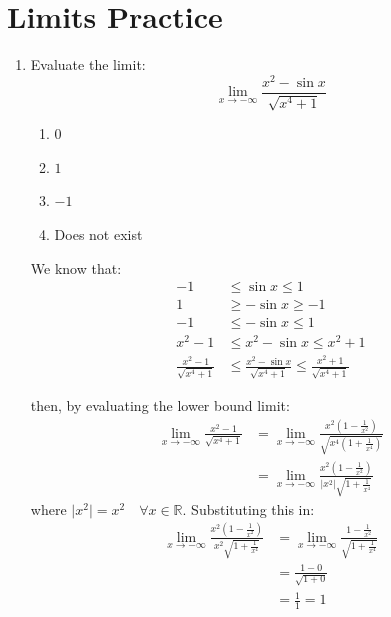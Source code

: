 \section*{Limits Practice}

\begin{enumerate}
\item Evaluate the limit:
$$\displaystyle \lim_{x \to -\infty}{\frac{x^2 - \sin{x}}{\sqrt{x^4 + 1}}}$$

\begin{enumerate}
    \item $0$
    \item $1$
    \item $-1$
    \item Does not exist
\end{enumerate}


\begin{enumerate}
    We know that:
    \begin{align*}
        -1 &\le \sin x \le 1 \\
        1 &\ge -\sin x \ge -1 \\
        -1 &\le -\sin x \le 1 \\
        x^2 - 1 &\le x^2 - \sin x \le x^2 + 1 \\
        \frac{x^2 - 1}{\sqrt{x^4 + 1}} &\le \frac{x^2 - \sin x}{\sqrt{x^4 + 1}} \le \frac{x^2 + 1}{\sqrt{x^4 + 1}}
    \end{align*}

    then, by evaluating the lower bound limit:
    \begin{align*}
        \lim_{x \to -\infty} \frac{x^2 - 1}{\sqrt{x^4 + 1}}
        &= \lim_{x \to -\infty} \frac{x^2\left(1 - \frac{1}{x^2}\right)}{\sqrt{x^4\left(1 + \frac{1}{x^4}\right)}} \\
        &= \lim_{x \to -\infty} \frac{x^2\left(1 - \frac{1}{x^2}\right)}{\lvert x^2 \rvert \sqrt{1 + \frac{1}{x^4}}}
    \end{align*}
    where $\lvert x^2 \rvert = x^2 \quad \forall x \in \mathbb{R}$. Substituting this in:
    \begin{align*}
        \lim_{x \to -\infty} \frac{x^2\left(1 - \frac{1}{x^2}\right)}{x^2 \sqrt{1 + \frac{1}{x^4}}}
        &= \lim_{x \to -\infty} \frac{1 - \frac{1}{x^2}}{\sqrt{1 + \frac{1}{x^4}}} \\
        &= \frac{1 - 0}{\sqrt{1 + 0}} \\
        &= \frac{1}{1} = 1
    \end{align*}


\end{enumerate}
\end{enumerate}
